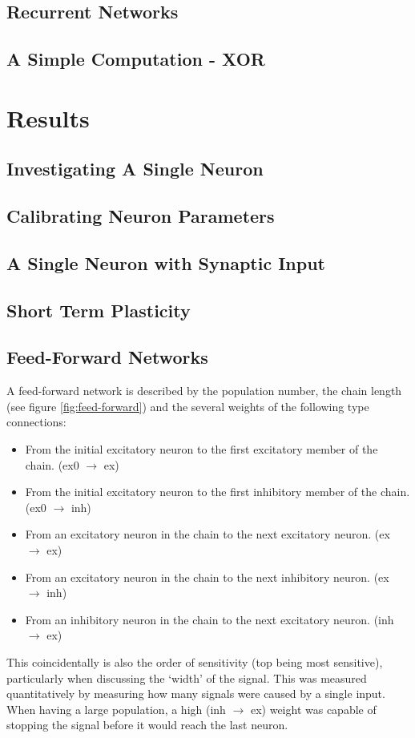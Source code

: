 \documentclass[10pt,a4paper]{article}
\begin{document}
\subsection{Recurrent Networks}

\subsection{A Simple Computation - XOR}

\section{Results}

\subsection{Investigating A Single Neuron}

\subsection{Calibrating Neuron Parameters}

\subsection{A Single Neuron with Synaptic Input}

\subsection{Short Term Plasticity}

\subsection{Feed-Forward Networks}
A feed-forward network is described by the population number, the chain length
(see figure \ref{fig:feed-forward}) and the several weights of the following
type connections:
\begin{itemize}
    \item From the initial excitatory neuron to the first excitatory member of the
        chain. (ex0 $\rightarrow$ ex)
    \item From the initial excitatory neuron to the first inhibitory member of the
        chain. (ex0 $\rightarrow$ inh)
    \item From an excitatory neuron in the chain to the next excitatory neuron.
        (ex $\rightarrow$ ex)
    \item From an excitatory neuron in the chain to the next inhibitory neuron.
        (ex $\rightarrow$ inh)
    \item From an inhibitory neuron in the chain to the next excitatory neuron.
        (inh $\rightarrow$ ex)
\end{itemize}
This coincidentally is also the order of sensitivity (top being most sensitive),
particularly when discussing the `width' of the signal. This was measured
quantitatively by measuring how many signals were caused by a single input. When
having a large population, a high (inh $\rightarrow$ ex) weight was capable of
stopping the signal before it would reach the last neuron.
\end{document}
